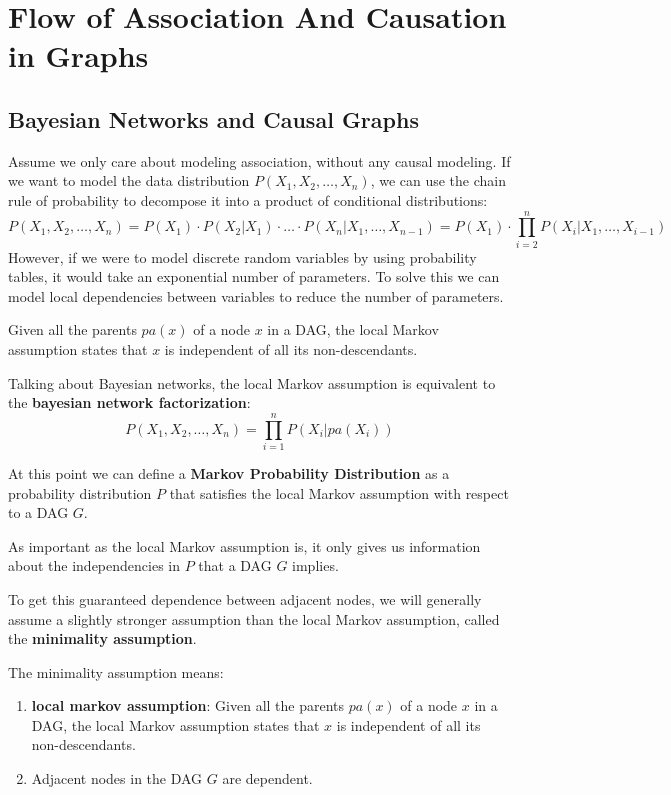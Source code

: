 \chapter{Flow of Association And Causation in Graphs}
\section{Bayesian Networks and Causal Graphs}
Assume we only care about modeling association, without any causal modeling. If
we want to model the data distribution $P(X_1, X_2, \ldots, X_n)$, we can use
the chain rule of probability to decompose it into a product of conditional
distributions:
\begin{equation}
    P(X_1, X_2, \ldots, X_n) = P(X_1) \cdot P(X_2|X_1) \cdot \ldots \cdot P(X_n|X_1,
    \ldots, X_{n-1}) = P(X_1) \cdot \prod_{i=2}^n P(X_i|X_1, \ldots, X_{i-1})
\end{equation}
However, if we were to model discrete random variables by using probability
tables, it would take an exponential number of parameters. To solve this we
can model local dependencies between variables to reduce the number of
parameters.

\begin{definition}
    Given all the parents $pa(x)$ of a node $x$ in a DAG, the local Markov
    assumption states that $x$ is independent of all its non-descendants.
\end{definition}
Talking about Bayesian networks, the local Markov assumption is equivalent to
the \textbf{bayesian network factorization}:
\begin{equation}
    P(X_1, X_2, \ldots, X_n) = \prod_{i=1}^n P(X_i|pa(X_i))
\end{equation}

At this point we can define a \textbf{Markov Probability Distribution} as a
probability distribution $P$ that satisfies the local Markov assumption with
respect to a DAG $G$.

As important as the local Markov assumption is, it only gives us information
about the independencies in $P$ that a DAG $G$ implies.

To get this guaranteed dependence between adjacent nodes, we will generally
assume a slightly stronger assumption than the local Markov assumption, called
the \textbf{minimality assumption}.
\begin{definition}
    The minimality assumption means:
    \begin{enumerate}
        \item \textbf{local markov assumption}: Given all the parents $pa(x)$ of
              a node $x$ in a DAG, the local Markov assumption states that $x$
              is independent of all its non-descendants.
        \item Adjacent nodes in the DAG $G$ are dependent.
    \end{enumerate}
\end{definition}

